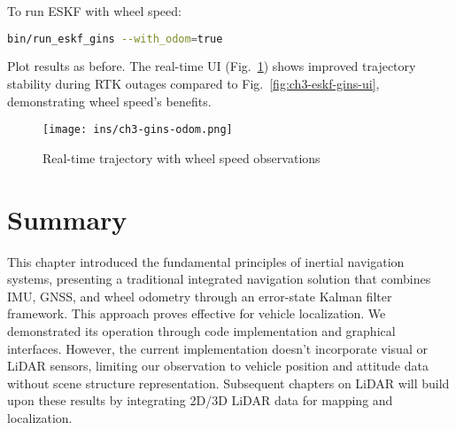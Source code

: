 To run ESKF with wheel speed:
\begin{lstlisting}[language=sh, caption=Terminal command:]
bin/run_eskf_gins --with_odom=true
\end{lstlisting}

Plot results as before. The real-time UI (Fig.~\ref{fig:ch3-gins-odom}) shows improved trajectory stability during RTK outages compared to Fig.~\ref{fig:ch3-eskf-gins-ui}, demonstrating wheel speed's benefits.

\begin{figure}
\centering
\texttt{[image: ins/ch3-gins-odom.png]}
\caption{Real-time trajectory with wheel speed observations}
\label{fig:ch3-gins-odom}
\end{figure}

\section{Summary}
This chapter introduced the fundamental principles of inertial navigation systems, presenting a traditional integrated navigation solution that combines IMU, GNSS, and wheel odometry through an error-state Kalman filter framework. This approach proves effective for vehicle localization. We demonstrated its operation through code implementation and graphical interfaces. However, the current implementation doesn't incorporate visual or LiDAR sensors, limiting our observation to vehicle position and attitude data without scene structure representation. Subsequent chapters on LiDAR will build upon these results by integrating 2D/3D LiDAR data for mapping and localization.

